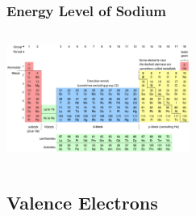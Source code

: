 \documentclass{beamer}
\begin{document}
\begin{frame}
    \frametitle{Energy Level of Sodium}
    \begin{columns}
        
        \begin{column}{0.5\textwidth}
            \includegraphics[width=6cm]{../../../../public/images/pTable.png}
            
        \end{column}
        \begin{column}{0.5\textwidth}
            
        \end{column}
    \end{columns}

\end{frame}

\subsection{Valence Electrons}
\end{document}
